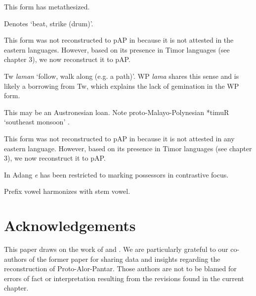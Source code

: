 {\tablenotetext}{This form has metathesized. }

{\tablenotetext}{Denotes `beat, strike (drum)'.}

{\tablenotetext}{This form was not reconstructed to pAP in \citep{HoltonEtAl2012} because it is not attested in the eastern languages. However, based on its presence in Timor languages (see chapter 3), we now reconstruct it to pAP.}

{\tablenotetext}{Tw\textit{ laman }`follow, walk along (e.g. a path)'. WP \textit{lama }shares this sense and is likely a borrowing from Tw, which explains the lack of gemination in the WP form. }

{\tablenotetext}{This may be an Austronesian loan. Note proto-Malayo-Polynesian *timuR `southeast monsoon'  \citep{BlustEtAl2010}.}

{\tablenotetext}{This form was not reconstructed to pAP in \citep{HoltonEtAl2012} because it is not attested in any eastern language. However, based on its presence in Timor languages (see chapter 3), we now reconstruct it to pAP. }

{\tablenotetext}{In Adang \textit{{\textglotstop}}\textit{e} has been restricted to marking possessors in contrastive focus.}

{\tablenotetext}{Prefix vowel harmonizes with stem vowel.}


\section*{Acknowledgements}

This paper draws on the work of \citet{HoltonEtAl2012} and \citet{RobinsonEtAl2012internal}. We are particularly grateful to our co-authors of the former paper for sharing data and insights regarding the reconstruction of Proto-Alor-Pantar. Those authors are not to be blamed for errors of fact or interpretation resulting from the revisions found in the current chapter.

 
